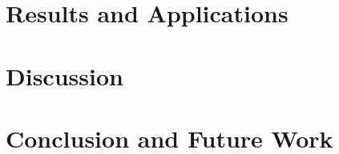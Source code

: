 \documentclass[12pt]{article}
\begin{document}
\section{Results and Applications}
%

\section{Discussion}

\section{Conclusion and Future Work}



\end{document}
